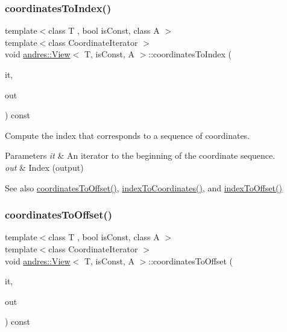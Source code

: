 \subsubsection{\texorpdfstring{coordinates\+To\+Index()}{coordinatesToIndex()}}
{\footnotesize\ttfamily template$<$class T , bool is\+Const, class A $>$ \\
template$<$class Coordinate\+Iterator $>$ \\
void \hyperlink{classandres_1_1View}{andres\+::\+View}$<$ T, is\+Const, A $>$\+::coordinates\+To\+Index (\begin{DoxyParamCaption}\item[{Coordinate\+Iterator}]{it,  }\item[{std\+::size\+\_\+t \&}]{out }\end{DoxyParamCaption}) const\hspace{0.3cm}{\ttfamily [inline]}}

Compute the index that corresponds to a sequence of coordinates.


\begin{DoxyParams}{Parameters}
{\em it} & An iterator to the beginning of the coordinate sequence. \\
\hline
{\em out} & Index (output) \\
\hline
\end{DoxyParams}
\begin{DoxySeeAlso}{See also}
\hyperlink{classandres_1_1View_aa5f0359e459abb7213522c9e21c5406b}{coordinates\+To\+Offset()}, \hyperlink{classandres_1_1View_a4162a6266478800ff5f64998b3a703fb}{index\+To\+Coordinates()}, and \hyperlink{classandres_1_1View_af0e5f1df969af5aeba3175f1be77923d}{index\+To\+Offset()} 
\end{DoxySeeAlso}
\mbox{\label{classandres_1_1View_aa5f0359e459abb7213522c9e21c5406b}} 
\subsubsection{\texorpdfstring{coordinates\+To\+Offset()}{coordinatesToOffset()}}
{\footnotesize\ttfamily template$<$class T , bool is\+Const, class A $>$ \\
template$<$class Coordinate\+Iterator $>$ \\
void \hyperlink{classandres_1_1View}{andres\+::\+View}$<$ T, is\+Const, A $>$\+::coordinates\+To\+Offset (\begin{DoxyParamCaption}\item[{Coordinate\+Iterator}]{it,  }\item[{std\+::size\+\_\+t \&}]{out }\end{DoxyParamCaption}) const\hspace{0.3cm}{\ttfamily [inline]}}

